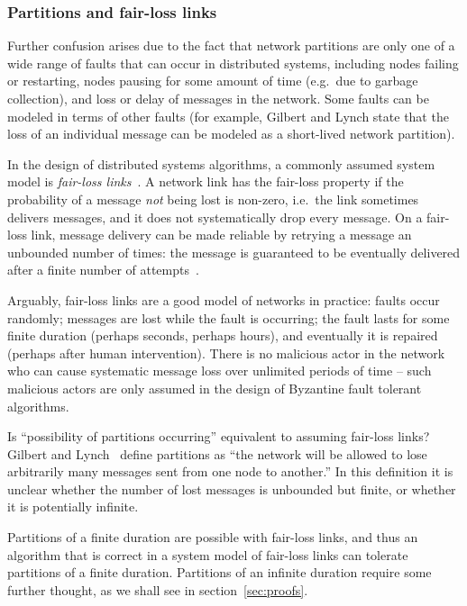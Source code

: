 \documentclass[a4paper,twocolumn,10pt]{article}
\begin{document}
\subsubsection{Partitions and fair-loss links}\label{sec:fairloss}

Further confusion arises due to the fact that network partitions are only one of a wide range of
faults that can occur in distributed systems, including nodes failing or restarting, nodes pausing
for some amount of time (e.g.\ due to garbage collection), and loss or delay of messages in the
network. Some faults can be modeled in terms of other faults (for example, Gilbert and Lynch state
that the loss of an individual message can be modeled as a short-lived network partition).

In the design of distributed systems algorithms, a commonly assumed system model is \emph{fair-loss
links}~\cite{Cachin2011wt}. A network link has the fair-loss property if the probability of a
message \emph{not} being lost is non-zero, i.e.\ the link sometimes delivers messages, and it does
not systematically drop every message. On a fair-loss link, message delivery can be made reliable by
retrying a message an unbounded number of times: the message is guaranteed to be eventually
delivered after a finite number of attempts~\cite{Cachin2011wt}.

Arguably, fair-loss links are a good model of networks in practice: faults occur randomly; messages
are lost while the fault is occurring; the fault lasts for some finite duration (perhaps seconds,
perhaps hours), and eventually it is repaired (perhaps after human intervention). There is no
malicious actor in the network who can cause systematic message loss over unlimited periods of time
-- such malicious actors are only assumed in the design of Byzantine fault tolerant algorithms.

Is ``possibility of partitions occurring'' equivalent to assuming fair-loss links? Gilbert and
Lynch~\cite{Gilbert2002il} define partitions as ``the network will be allowed to lose arbitrarily
many messages sent from one node to another.'' In this definition it is unclear whether the number
of lost messages is unbounded but finite, or whether it is potentially infinite.

Partitions of a finite duration are possible with fair-loss links, and thus an algorithm that is
correct in a system model of fair-loss links can tolerate partitions of a finite duration.
Partitions of an infinite duration require some further thought, as we shall see in
section~\ref{sec:proofs}.
\end{document}
